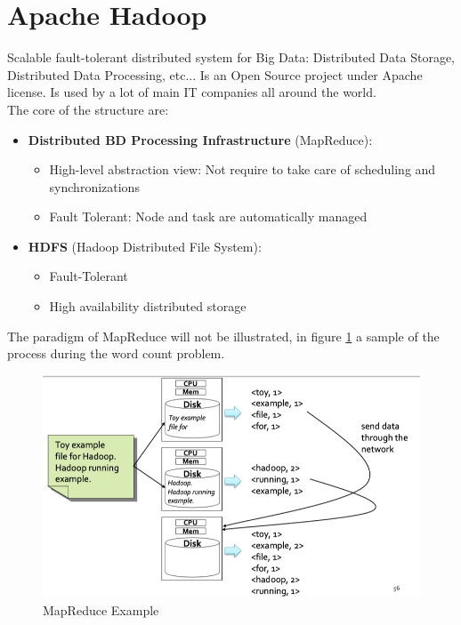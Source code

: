 \documentclass[12pt]{article}
\begin{document}

\section{Apache Hadoop}
Scalable fault-tolerant distributed system for Big Data: Distributed Data Storage, Distributed Data Processing, etc...
Is an Open Source project under Apache license. Is used by a lot of main IT companies all around the world.\\
The core of the structure are:
\begin{itemize}
  \item \textbf{Distributed BD Processing Infrastructure} (MapReduce):
  \begin{itemize}
    \item High-level abstraction view: Not require to take care of scheduling and synchronizations
    \item Fault Tolerant: Node and task are automatically managed
  \end{itemize}
  \item \textbf{HDFS} (Hadoop Distributed File System):
  \begin{itemize}
    \item Fault-Tolerant
    \item High availability distributed storage
  \end{itemize}
\end{itemize}
The paradigm of MapReduce will not be illustrated, in figure \ref{fig:mapreduce} a sample of the process during the word count problem.
\begin{figure}[H]
  \includegraphics[width=\linewidth]{images/mapreduce.png}
  \caption{MapReduce Example}
  \label{fig:mapreduce}
\end{figure}
\end{document}
